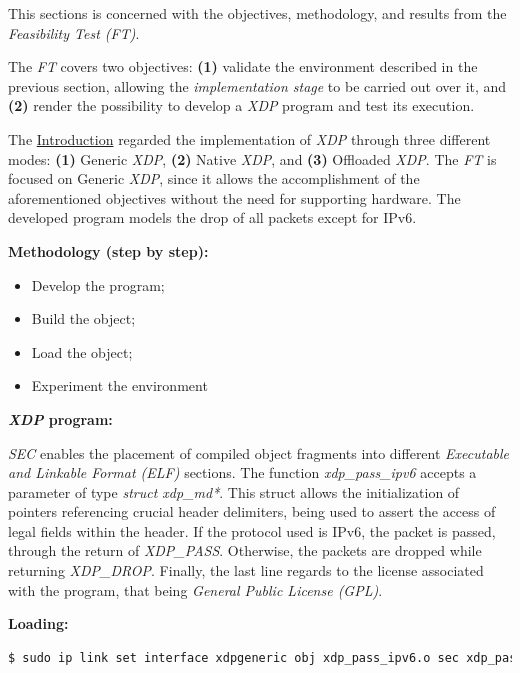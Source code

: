 This sections is concerned with the objectives, methodology, and results from the \textit{Feasibility Test (FT)}.

The \textit{FT} covers two objectives: \textbf{(1)} validate the environment described in the previous section, allowing the \textit{implementation stage} to be carried out over it, and \textbf{(2)} render the possibility to develop a \textit{XDP} program and test its execution.

The \hyperref[sec:Introduction]{Introduction} regarded the implementation of \textit{XDP} through three different modes: \textbf{(1)} Generic \textit{XDP}, \textbf{(2)} Native \textit{XDP}, and \textbf{(3)} Offloaded \textit{XDP}.
The \textit{FT} is focused on Generic \textit{XDP}, since it allows the accomplishment of the aforementioned objectives without the need for supporting hardware.
The developed program models the drop of all packets except for IPv6.

\noindent \textbf{Methodology (step by step):}
\begin{itemize}
    \item Develop the program;
    \item Build the object;
    \item Load the object;
    \item Experiment the environment
\end{itemize}

\noindent \textbf{\textit{XDP} program:}


\textit{SEC} enables the placement of compiled object fragments into different \textit{Executable and Linkable Format (ELF)} sections.
The function \textit{xdp\_pass\_ipv6} accepts a parameter of type \textit{struct xdp\_md*}.
This struct allows the initialization of pointers referencing crucial header delimiters, being used to assert the access of legal fields within the header.
If the protocol used is IPv6, the packet is passed, through the return of \textit{XDP\_PASS}.
Otherwise, the packets are dropped while returning \textit{XDP\_DROP}.
Finally, the last line regards to the license associated with the program, that being \textit{General Public License (GPL)}\cite{XDPRedHat}.

\noindent \textbf{Loading:}

\begin{lstlisting}[language=Bash]
$ sudo ip link set interface xdpgeneric obj xdp_pass_ipv6.o sec xdp_pass_ipv6
\end{lstlisting}

